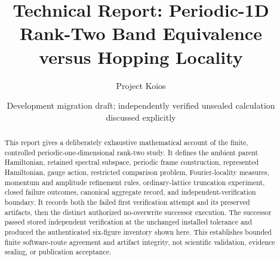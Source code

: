 \documentclass[11pt]{article}
\title{Technical Report: Periodic-1D Rank-Two Band Equivalence versus Hopping Locality}
\author{Project Koios}
\date{Development migration draft; independently verified unsealed calculation discussed explicitly}
\begin{document}
\maketitle
\begin{abstract}
This report gives a deliberately exhaustive mathematical account of the finite,
controlled periodic-one-dimensional rank-two study.  It defines the ambient parent
Hamiltonian, retained spectral subspace, periodic frame construction, represented
Hamiltonian, gauge action, restricted comparison problem, Fourier-locality measures,
momentum and amplitude refinement rules, ordinary-lattice truncation experiment,
closed failure outcomes, canonical aggregate record, and independent-verification
boundary.  It records both the failed first verification attempt and its preserved
artifacts, then the distinct authorized no-overwrite successor execution.  The successor
passed stored independent verification at the unchanged installed tolerance and produced
the authenticated six-figure inventory shown here.  This establishes bounded finite
software-route agreement and artifact integrity, not scientific validation, evidence
sealing, or publication acceptance.
\end{abstract}

\tableofcontents
\clearpage








\appendix

\end{document}
